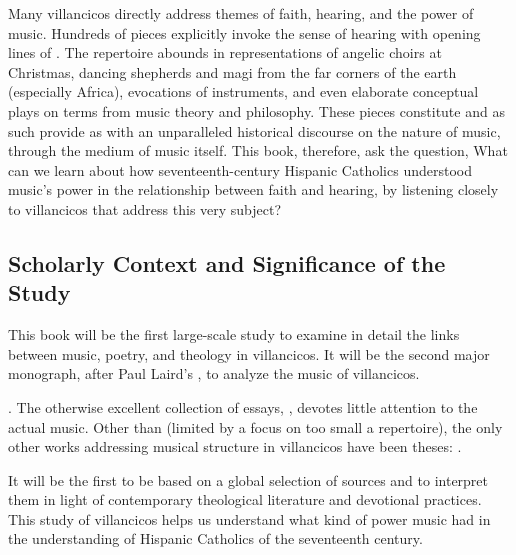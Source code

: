 \documentclass{vcbook-proposal}
\begin{document}
Many villancicos directly address themes of faith, hearing, and the power of 
music.
Hundreds of pieces explicitly invoke the sense of hearing with opening lines of 
  .
The repertoire abounds in representations of angelic choirs at Christmas, 
dancing shepherds and magi from the far corners of the earth (especially 
Africa), evocations of instruments, and even elaborate conceptual plays on 
terms from music theory and philosophy.
These pieces constitute  and as such provide as with 
an unparalleled historical discourse on the nature of music, through the medium 
of music itself.
This book, therefore, ask the question,
What can we learn about how seventeenth-century Hispanic Catholics understood 
music's power in the relationship between faith and hearing, by listening 
closely to villancicos that address this very subject?

\subsection{Scholarly Context and Significance of the Study}

This book will be the first large-scale study to examine in detail the links 
between music, poetry, and theology in villancicos.
It will be the second major monograph, after Paul Laird's , to analyze the music of villancicos.%
  \begin{Footnote}
  \autocite{Laird:VC}. 
  The otherwise excellent collection of essays, 
\autocite{Knighton-Torrente:VCs}, devotes little attention to the actual music.
  Other than \autocite{Rubio:Forma} (limited by a focus on too small a 
repertoire), the only other works addressing musical structure in villancicos 
have been theses: \autocites{CaberoPueyo:PhD}{Illari:Polychoral}.
  \end{Footnote}
It will be the first to be based on a global selection of sources and to 
interpret them in light of contemporary theological literature and devotional 
practices.
This study of villancicos helps us understand what kind of power music had in 
the understanding of Hispanic Catholics of the seventeenth century.
\end{document}
